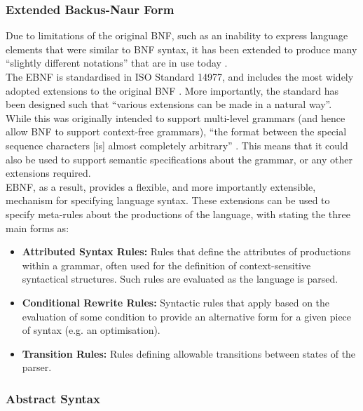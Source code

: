 
\subsubsection{Extended Backus-Naur Form} %
\label{ssub:extended_backus_naur_form}
Due to limitations of the original BNF, such as an inability to express language elements that were similar to BNF syntax, it has been extended to produce many ``slightly different notations'' that are in use today \citep{standard1996ebnf}.\\

The EBNF is standardised in ISO Standard 14977, and includes the most widely adopted extensions to the original BNF \citep{standard1996ebnf}.
More importantly, the standard has been designed such that ``various extensions can be made in a natural way''.
While this was originally intended to support multi-level grammars (and hence allow BNF to support context-free grammars), ``the format between the special sequence characters [is] almost completely arbitrary'' \citep[pg. vii]{standard1996ebnf}.
This means that it could also be used to support semantic specifications about the grammar, or any other extensions required.\\

EBNF, as a result, provides a flexible, and more importantly extensible, mechanism for specifying language syntax.
These extensions can be used to specify meta-rules about the productions of the language, with \citet{slonneger1995formal} stating the three main forms as:
\begin{itemize}
    \item \textbf{Attributed Syntax Rules:} Rules that define the attributes of productions within a grammar, often used for the definition of context-sensitive syntactical structures. 
    Such rules are evaluated as the language is parsed. 
    \item \textbf{Conditional Rewrite Rules:} Syntactic rules that apply based on the evaluation of some condition to provide an alternative form for a given piece of syntax (e.g. an optimisation). 
    \item \textbf{Transition Rules:} Rules defining allowable transitions between states of the parser. 
\end{itemize}

\newpage
\subsubsection{Abstract Syntax} %
\label{ssub:abstract_syntax}

